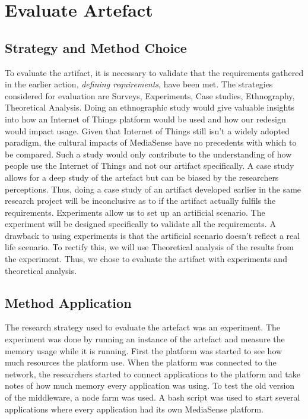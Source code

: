 \section{Evaluate Artefact}
\subsection{Strategy and Method Choice}
To evaluate the artifact, it is necessary to validate that the requirements gathered in the earlier action, \emph{defining requirements}, have been met. The strategies considered for evaluation are Surveys, Experiments, Case studies, Ethnography, Theoretical Analysis. 
Doing an ethnographic study would give valuable insights into how an Internet of Things platform would be used and how our redesign would impact usage. 
Given that Internet of Things still isn't a widely adopted paradigm, the cultural impacts of MediaSense have no precedents with which to be compared. Such a study would only contribute to the understanding of how people use the Internet of Things and not our artifact specifically. A case study allows for a deep study of the artefact but can be biased by the researchers perceptions. Thus, doing a case study of an artifact developed earlier in the same research project will be inconclusive as to if the artifact actually fulfils the requirements. Experiments allow us to set up an artificial scenario. The experiment will be designed specifically to validate all the requirements. A drawback to using experiments is that the artificial scenario doesn't reflect a real life scenario. To rectify this, we will use Theoretical analysis of the results from the experiment. Thus, we chose to evaluate the artifact with experiments and theoretical analysis.


\subsection{Method Application}
The research strategy used to evaluate the artefact was an experiment. The experiment was done by running an instance of the artefact and measure the memory usage while it is running. First the platform was started to see how much resources the platform use. When the platform was connected to the network, the researchers started to connect applications to the platform and take notes of how much memory every application was using. To test the old version of the middleware, a node farm was used. A bash script was used to start several applications where every application had its own MediaSense platform. 

